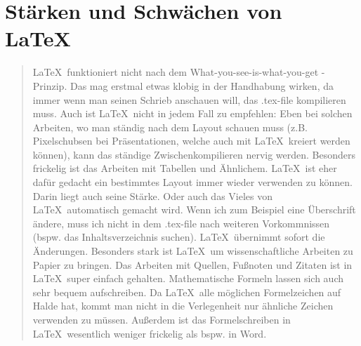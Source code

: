 \pagebreak
\section*{Stärken und Schwächen von \LaTeX\ } 
\begin{quote}
\noindent
\LaTeX \ funktioniert nicht nach dem What-you-see-is-what-you-get - Prinzip.
Das mag erstmal etwas klobig in der Handhabung wirken, da immer wenn man seinen Schrieb anschauen will, das .tex-file
kompilieren muss.
Auch ist \LaTeX \ nicht in jedem Fall zu empfehlen: Eben bei solchen Arbeiten, wo man ständig nach dem Layout schauen muss
(z.B. Pixelschubsen bei Präsentationen, welche auch mit \LaTeX \ kreiert werden können), kann das ständige Zwischenkompilieren
nervig werden.
Besonders frickelig ist das Arbeiten mit Tabellen und Ähnlichem.
\LaTeX \ ist eher dafür gedacht ein bestimmtes Layout immer wieder verwenden zu können.
Darin liegt auch seine Stärke.
Oder auch das Vieles von \LaTeX \ automatisch gemacht wird. Wenn ich zum Beispiel eine Überschrift ändere, muss ich nicht in dem 
.tex-file nach weiteren Vorkommnissen (bspw. das Inhaltsverzeichnis suchen).
\LaTeX \ übernimmt sofort die Änderungen.
Besonders stark ist \LaTeX \ um wissenschaftliche Arbeiten zu Papier zu bringen.
Das Arbeiten mit Quellen, Fußnoten und Zitaten ist in \LaTeX \ super einfach gehalten.
Mathematische Formeln lassen sich auch sehr bequem aufschreiben.
Da \LaTeX \ alle möglichen Formelzeichen auf Halde hat, kommt man nicht in die Verlegenheit nur ähnliche Zeichen verwenden zu müssen.
Außerdem ist das Formelschreiben in \LaTeX \ wesentlich weniger frickelig als bspw. in Word.
\end{quote}
